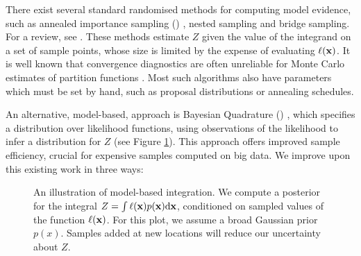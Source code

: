 \documentclass{article} %
\begin{document}

There exist several standard randomised methods for computing model evidence, such as annealed importance sampling () \cite{neal2001annealed}, nested sampling \cite{skilling2004nested} and bridge sampling.  For a review, see \cite{chen2000monte}.   These methods estimate $Z$ given the value of the integrand on a set of sample points, whose size is limited by the expense of evaluating $\ell(\vlfv)$.  It is well known that convergence diagnostics are often unreliable for Monte Carlo estimates of partition functions  \cite{NealMC, brooks1998convergence, cowles1999possible}.  Most such algorithms also have parameters which must be set by hand, such as proposal distributions or annealing schedules.


An alternative, model-based, approach is Bayesian Quadrature () \cite{stanford1986bayesian, BZHermiteQuadrature, kennedy1998bayesian, BZMonteCarlo}, which specifies a distribution over likelihood functions, using observations of the likelihood to infer a distribution for $Z$ (see Figure \ref{fig:model_based}). This approach offers improved sample efficiency, crucial for expensive samples computed on big data. We improve upon this existing work in three ways:

\begin{figure}
\centering
{}
\caption{An illustration of model-based integration.  We compute a posterior for the integral $Z = \int \lfn(\vlfv) p(\vlfv) \ud\vlfv$, conditioned on sampled values of the function $\lfn(\vlfv)$. For this plot, we assume a broad Gaussian prior $p(x)$. Samples added at new locations will reduce our uncertainty about $Z$.}
\label{fig:model_based}
\end{figure}
\end{document}
